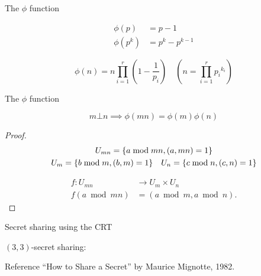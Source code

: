 \begin{frame}{The $\phi$ function}
  \begin{theorem}
	\begin{align*}
	  \phi(p) &= p - 1 \\
	  \phi(p^k) &= p^k - p^{k-1}
	\end{align*}
  \end{theorem}

  \pause
  \[
	\phi(n) = n \prod_{i=1}^{r} (1 - \frac{1}{p_i}) \quad (n = \prod_{i=1}^{r} {p_i}^{k_i})
  \]

  \begin{quote}
  \end{quote}


\end{frame}
\begin{frame}{The $\phi$ function}
  \begin{theorem}
	\[
	  m \bot n \implies \phi(mn) = \phi(m) \phi(n)
	\]
  \end{theorem}

  \pause
  \begin{proof}
	\begin{gather*}
	  U_{mn} = \{a \bmod mn, (a, mn) = 1\} \\
	  U_{m} = \{b \bmod m, (b,m) = 1\} \quad U_{n} = \{c \bmod n, (c,n) = 1\}
	\end{gather*}

	\pause
	\begin{align*}
	  f: U_{mn} &\to U_m \times U_n \\
	  f(a \bmod mn) &= (a \bmod m, a \bmod n).
	\end{align*}
  \end{proof}
\end{frame}
\begin{frame}{Secret sharing using the CRT}
  \begin{definition}
	$(3,3)$-secret sharing:
  \end{definition}

  \pause
  \begin{alertblock}{Reference}
	``How to Share a Secret'' by Maurice Mignotte, 1982.
  \end{alertblock}
\end{frame}
